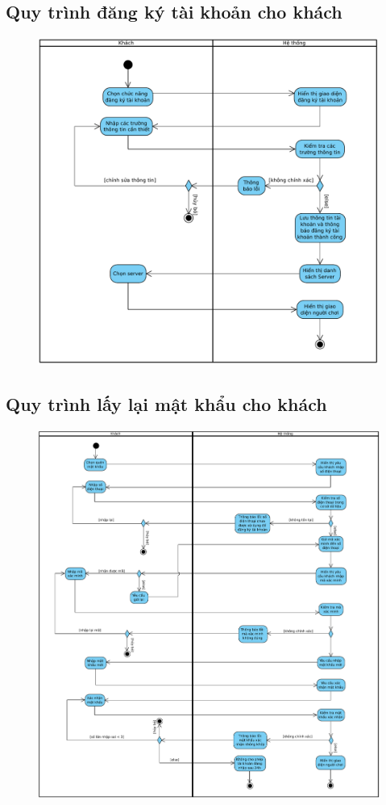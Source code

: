 \documentclass[3p]{elsarticle}
\begin{document}
\subsection{Quy trình đăng ký tài khoản cho khách}
\begin{figure}[!htbp]
	\centering
	\includegraphics[scale=.7]{images/signup.pdf}
\end{figure}
%
\newpage
\subsection{Quy trình lấy lại mật khẩu cho khách}
\begin{figure}[!htbp]
	\centering
	\includegraphics[scale=.5]{images/forgetPass.pdf}
\end{figure}
%
\newpage
\end{document}
